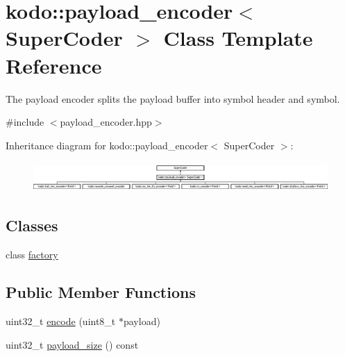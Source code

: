 \hypertarget{classkodo_1_1payload__encoder}{\section{kodo\-:\-:payload\-\_\-encoder$<$ Super\-Coder $>$ Class Template Reference}
\label{classkodo_1_1payload__encoder}
}


The payload encoder splits the payload buffer into symbol header and symbol.  




{\ttfamily \#include $<$payload\-\_\-encoder.\-hpp$>$}

Inheritance diagram for kodo\-:\-:payload\-\_\-encoder$<$ Super\-Coder $>$\-:\begin{figure}[H]
\begin{center}
\leavevmode
\includegraphics[height=1.142857cm]{classkodo_1_1payload__encoder}
\end{center}
\end{figure}
\subsection*{Classes}
\begin{DoxyCompactItemize}
\item 
class \hyperlink{classkodo_1_1payload__encoder_1_1factory}{factory}
\end{DoxyCompactItemize}
\subsection*{Public Member Functions}
\begin{DoxyCompactItemize}
\item 
uint32\-\_\-t \hyperlink{classkodo_1_1payload__encoder_a1d22d198e28d8c1fd74057c85ceee16e}{encode} (uint8\-\_\-t $\ast$payload)
\begin{DoxyCompactList}\small\item\em \end{DoxyCompactList}\item 
uint32\-\_\-t \hyperlink{classkodo_1_1payload__encoder_a582ec311f719711a8e1eed9e19bdcf59}{payload\-\_\-size} () const 
\begin{DoxyCompactList}\small\item\em \end{DoxyCompactList}\end{DoxyCompactItemize}


